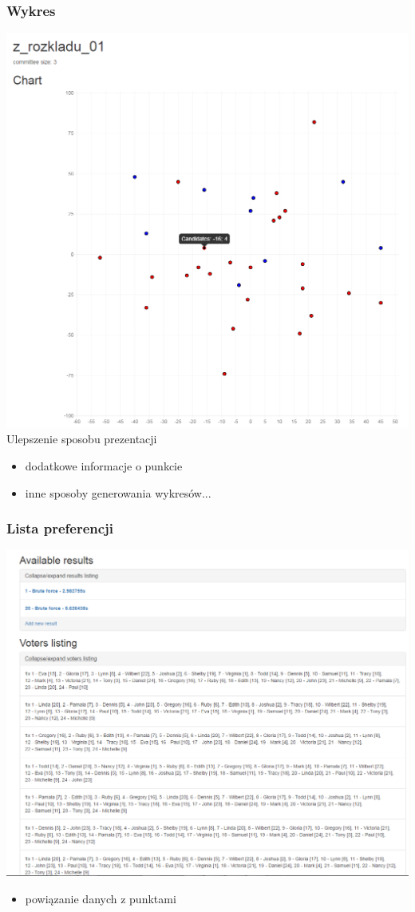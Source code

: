 \documentclass{beamer}
\begin{document}
\begin{frame}
\frametitle{Wykres}
\begin{multicols}{2}
\includegraphics[height=0.6\paperheight]{screenshots/18_wykres.png}\\
Ulepszenie sposobu prezentacji
\begin{itemize}
\item dodatkowe informacje o punkcie
\item inne sposoby generowania wykresów...
\end{itemize}
\end{multicols}
\end{frame}
\begin{frame}
\frametitle{Lista preferencji}
\includegraphics[height=0.5\paperheight]{screenshots/19_szczegoly.png}
\begin{itemize}
\item powiązanie danych z punktami
\end{itemize}
\end{frame}
\end{document}
